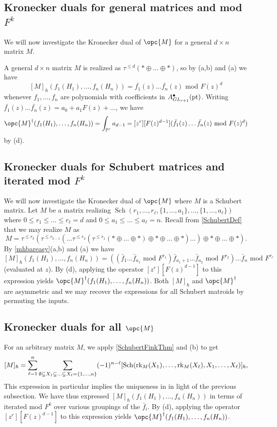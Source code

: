 \documentclass[12pt]{amsart}
\newcommand{\mb}{\mathbb}
\newcommand{\pt}{{\rm pt}}
\newcommand{\rk}{{\rm rk}}
\theoremstyle{plain}
\theoremstyle{definition}
\theoremstyle{remark}
\begin{document}
\subsection{Kronecker duals for general matrices and mod $F^k$}
\label{PDGM}
We will now investigate the Kronecker dual of $\opc{M}$ for a general $d \times n$ matrix $M$.

A general $d \times n$ matrix $M$ is realized as $\tau^{\le d}(\ast \oplus \ldots \oplus \ast)$, so by (a,b) and (a) we have $$[M]_\hbar(f_1(H_1),\ldots,f_n(H_n))=\bar{f_1}(z)\ldots\bar{f_n}(z)\text{ mod }F(z)^d$$ whenever $f_1, \ldots, f_n$ are polynomials with coefficients in $A^\bullet_{GL_{r+1}}(\pt)$. Writing $\bar{f_1}(z)\ldots\bar{f_n}(z)=a_0+a_1F(z)+\ldots$, we have $$\opc{M}^\dagger(f_1(H_1),\ldots,f_n(H_n))=\int_{\mb{P}^r} a_{d-1}=[z^r][F(z)^{d-1}](\bar{f_1}(z)\ldots\bar{f_n}(z)\text{ mod }F(z)^d)$$ by (d).

\subsection{Kronecker duals for Schubert matrices and iterated mod $F^k$}
We will now investigate the Kronecker dual of $\opc{M}$ where $M$ is a Schubert matrix. Let $M$ be a matrix realizing $\operatorname{Sch}(r_1, \ldots, r_\ell, \{1, \ldots, a_1\}, \ldots, \{1, \ldots, a_\ell\})$ where $0 \leq r_1 \leq \ldots \leq r_\ell = d$ and $0 \leq a_1 \leq \ldots \leq a_\ell = n$. Recall from \cref{SchubertDef} that we may realize $M$ as $$M = \tau^{\le r_k}(\tau^{\le r_{k-1}}(\ldots\tau^{\le r_2}(\tau^{\le r_1}(\ast \oplus \ldots \oplus \ast)\oplus \ast \oplus \ldots \oplus \ast)\ldots)\oplus \ast \oplus \ldots \oplus \ast).$$
By \cref{mhbareasy}(a,b) and (a) we have
$$[M]_\hbar(f_1(H_1),\ldots,f_n(H_n))=\left(\left(\bar{f}_1\ldots\bar{f}_{a_1}\text{ mod }F^{r_1}\right)\bar{f}_{a_1+1}\ldots \bar{f}_{a_2}\text{ mod }F^{r_2}\right)\ldots\bar{f}_n\text{ mod }F^{r_\ell}$$ (evaluated at $z$). By (d), applying the operator $[z^r][F(z)^{d-1}]$ to this expression yields $\opc{M}^\dagger(f_1(H_1),\ldots,f_n(H_n))$. Both $[M]_\hbar$ and $\opc{M}^\dagger$ are asymmetric and we may recover the expressions for all Schubert matroids by permuting the inputs.


\subsection{Kronecker duals for all $\opc{M}$} \label{poincaredualsforallom}
For an arbitrary matrix $M$, we apply \cref{SchubertFinkThm} and (b) to get $$[M]_\hbar=\sum_{\ell=1}^n\sum_{\emptyset \subsetneq X_1  \subsetneq \ldots \subsetneq X_\ell = \{1,\ldots,n\}}(-1)^{n-\ell}[\operatorname{Sch}(\rk_M(X_1),\ldots,\rk_M(X_\ell),X_1,\ldots,X_\ell)]_\hbar,$$
This expression in particular implies the uniqueness in  in light of the previous subsection. We have thus expressed $[M]_\hbar(f_1(H_1), \ldots, f_n(H_n))$ in terms of iterated mod $F^k$ over various groupings of the $\bar{f}_i$. By (d), applying the operator $[z^r][F(z)^{d-1}]$ to this expression yields $\opc{M}^\dagger(f_1(H_1),\ldots,f_n(H_n))$.
\end{document}
